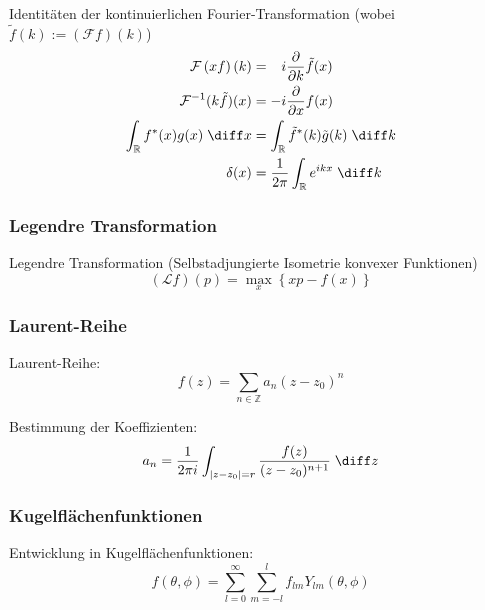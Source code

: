 \documentclass[11pt]{article}
\numberwithin{equation}{section}
\begin{document}
        Identitäten der kontinuierlichen Fourier-Transformation (wobei $\tilde{f}(k) := \left(\mathcal{F}f\right)(k)$)
        \begin{equation}
          \begin{aligned}
            \mathcal{F}\left(xf\right)(k) &= \phantom{-}i \pder{}{k}\tilde{f}(x) \\
            \mathcal{F}^{-1}(k\tilde{f})(x) &= -i\pder{}{x}f(x) \\
            \int_{\mathbb{R}} f^{*}(x) g(x)\;\diff x &=
            \int_{\mathbb{R}}\tilde{f}^{*}(k)\tilde{g}(k)\;\diff k \\
            \delta(x) &= \frac{1}{2\pi}\int_{\mathbb{R}}e^{ikx}\;\diff k \\
          \end{aligned}
        \end{equation}

      \subsubsection{Legendre Transformation}
        Legendre Transformation (Selbstadjungierte Isometrie konvexer Funktionen)
        \begin{equation}
          (\mathcal{L}f)(p)=\max_x\left\lbrace xp-f(x) \right\rbrace
        \end{equation}


      \subsubsection{Laurent-Reihe}
        Laurent-Reihe:
        \begin{equation}
          f(z)=\sum_{n\in\mathbb{Z}} a_n(z-z_0)^n
        \end{equation}

        Bestimmung der Koeffizienten:
        \begin{equation}
          a_n = \frac{1}{2 \pi i}\int_{\left| z-z_0 \right| = r} \frac{f(z)}{(z-z_0)^{n+1}}\;\diff z
        \end{equation}

      \subsubsection{Kugelflächenfunktionen}
        Entwicklung in Kugelflächenfunktionen:
        \begin{equation}
          f(\theta, \phi) = \sum_{l=0}^{\infty} \sum_{m=-l}^{l} f_{lm} Y_{lm}(\theta,\phi)
        \end{equation}
\end{document}
